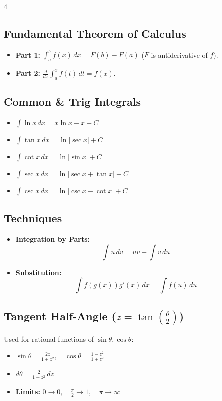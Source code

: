 \documentclass[8pt, landscape, a4paper]{scrartcl}
\begin{document}
\begin{multicols*}{4}
\subsection*{Fundamental Theorem of Calculus}
\begin{itemize}
    \item \textbf{Part 1:} $\int_{a}^{b} f(x) \, dx = F(b) - F(a)$ ($F$ is antiderivative of $f$).
    \item \textbf{Part 2:} $\frac{d}{dx} \int_{a}^{x} f(t) \, dt = f(x)$.
\end{itemize}

\subsection*{Common \& Trig Integrals}
\begin{itemize}
    \item $\int \ln x \, dx = x \ln x - x + C$
    \item $\int \tan x \, dx = \ln |\sec x| + C$
    \item $\int \cot x \, dx = \ln |\sin x| + C$
    \item $\int \sec x \, dx = \ln |\sec x + \tan x| + C$
    \item $\int \csc x \, dx = \ln |\csc x - \cot x| + C$
\end{itemize}

\subsection*{Techniques}
\begin{itemize}
    \item \textbf{Integration by Parts:}
    \[ \int u \, dv = uv - \int v \, du \]
    \item \textbf{Substitution:}
    \[ \int f(g(x))g'(x) \, dx = \int f(u) \, du \]
\end{itemize}

\subsection*{Tangent Half-Angle ($z=\tan\left(\frac{\theta}{2}\right)$)}
Used for rational functions of $\sin\theta, \cos\theta$:
\begin{itemize}
    \item $\sin\theta = \frac{2z}{1+z^2}, \quad \cos\theta = \frac{1-z^2}{1+z^2}$
    \item $d\theta = \frac{2}{1+z^2} \,dz$
    \item \textbf{Limits:} $0 \to 0, \quad \frac{\pi}{2} \to 1, \quad \pi \to \infty$
\end{itemize}


\end{multicols*}
\end{document}
